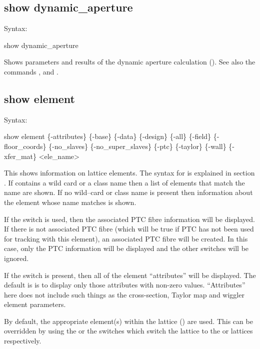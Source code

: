 {{{{{{{{\subsection{show dynamic_aperture}
\label{s:show.da}

Syntax:
\begin{example}
  show dynamic_aperture
\end{example}

Shows parameters and results of the dynamic aperture calculation ().
See also the commands , and .


\subsection{show element}
\label{s:show.element}

Syntax:
\begin{example}
  show element \{-attributes\} \{-base\} \{-data\} \{-design\} \{-all\} \{-field\}
      \{-floor_coords\} \{-no_slaves\} \{-no_super_slaves\} \{-ptc\} \{-taylor\} \{-wall\} 
      \{-xfer_mat\} <ele_name>
\end{example}

This shows information on lattice elements. The syntax for  is explained in
section . If  contains a wild card or a class name
then a list of elements that match the name are shown. If no wild--card or class name is
present then information about the element whose name matches  is shown.

If the  switch is used, then the associated PTC fibre information will be
displayed. If there is not associated PTC fibre (which will be true if PTC has not been
used for tracking with this element), an associated PTC fibre will be created. In this
case, only the PTC information will be displayed and the other switches will be ignored.

If the  switch is present, then all of the element ``attributes'' will be
displayed. The default is is to display only those attributes with non-zero
values. ``Attributes'' here does not include such things as the cross-section, Taylor map
and wiggler element parameters.

By default, the appropriate element(s) within the  lattice ()
are used. This can be overridden by using the  or the  switches
which switch the lattice to the  or  lattices respectively.

}}}}}}}}
